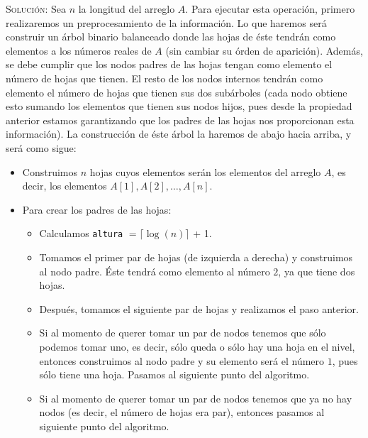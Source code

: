 \documentclass[letterpaper,11pt]{article}
\begin{document}
\begin{enumerate}
\begin{itemize}
        \textsc{Solución:} Sea $n$ la longitud del arreglo $A$. Para ejecutar
        esta operación, primero realizaremos un preprocesamiento de la 
        información. Lo que haremos será construir un árbol binario balanceado 
        donde las hojas de éste tendrán como elementos a los números reales de 
        $A$ (sin cambiar su órden de aparición). Además, se debe cumplir que 
        los nodos padres de las hojas tengan como elemento el número de hojas 
        que tienen. El resto de los nodos internos tendrán como elemento el 
        número de hojas que tienen sus dos subárboles (cada nodo obtiene esto 
        sumando los elementos que tienen sus nodos hijos, pues desde la 
        propiedad anterior estamos garantizando que los padres de las hojas nos 
        proporcionan esta información). La construcción de éste árbol la haremos 
        de abajo hacia arriba, y será como sigue:
        \begin{itemize}
            \item Construimos $n$ hojas cuyos elementos serán los elementos del 
            arreglo $A$, es decir, los elementos $A[1], A[2], \ldots, A[n]$.

            \item Para crear los padres de las hojas:
            \begin{itemize}
                \item Calculamos \texttt{altura} $= \lceil \log(n)\rceil$ + 1. 
    
                \item Tomamos el primer par de hojas (de izquierda a derecha) y 
                construimos al nodo padre. Éste tendrá como elemento al número 
                $2$, ya que tiene dos hojas.
    
                \item Después, tomamos el siguiente par de hojas y realizamos el 
                paso anterior. 
                
                \item Si al momento de querer tomar un par de nodos tenemos que 
                sólo podemos tomar uno, es decir, sólo queda o sólo hay una hoja 
                en el nivel, entonces construimos al nodo padre y su elemento 
                será el número $1$, pues sólo tiene una hoja. Pasamos al
                siguiente punto del algoritmo.

                \item Si al momento de querer tomar un par de nodos tenemos que 
                ya no hay nodos (es decir, el número de hojas era par), entonces 
                pasamos al siguiente punto del algoritmo.
            \end{itemize}


\end{itemize}
\end{itemize}
\end{enumerate}
\end{document}
